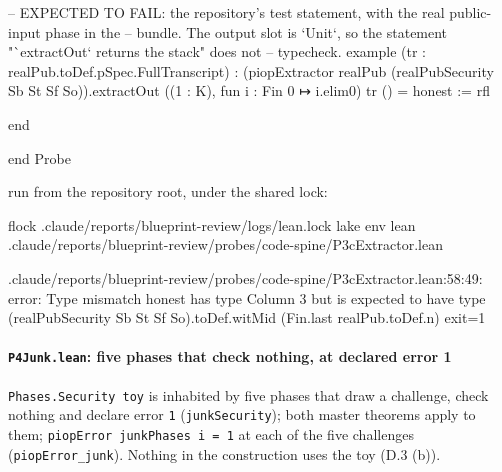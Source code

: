 \begin{leancode}
-- EXPECTED TO FAIL: the repository's test statement, with the real public-input phase in the
-- bundle. The output slot is `Unit`, so the statement "`extractOut` returns the stack" does not
-- typecheck.
example (tr : realPub.toDef.pSpec.FullTranscript) :
    (piopExtractor realPub (realPubSecurity Sb St Sf So)).extractOut
      ((1 : K), fun i : Fin 0 ↦ i.elim0) tr () = honest := rfl

end

end Probe
\end{leancode}

run from the repository root, under the shared lock:

\begin{shellcode}
flock .claude/reports/blueprint-review/logs/lean.lock lake env lean .claude/reports/blueprint-review/probes/code-spine/P3cExtractor.lean
\end{shellcode}


\begin{srccode}
.claude/reports/blueprint-review/probes/code-spine/P3cExtractor.lean:58:49: error: Type mismatch
  honest
has type
  Column 3
but is expected to have type
  (realPubSecurity Sb St Sf So).toDef.witMid (Fin.last realPub.toDef.n)
exit=1
\end{srccode}

\paragraph{\texttt{P4Junk.lean}: five phases that check nothing, at declared error 1}\label{sec:gen-probe-spine-P4Junk}

\texttt{Phases.\allowbreak{}Security toy} is inhabited by five phases that draw a challenge, check nothing and declare error \texttt{1} (\texttt{junkSecurity}); both master theorems apply to them; \texttt{piopError junkPhases i = 1} at each of the five challenges (\texttt{piopError\_\allowbreak{}junk}). Nothing in the construction uses the toy (D.3 (b)).


